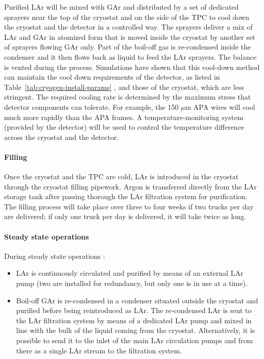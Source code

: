 Purified LAr will be mixed with GAr and distributed by a set of dedicated sprayers near the top of the cryostat and on the side of the TPC to cool down the cryostat and the detector in a controlled way. The sprayers deliver a mix of LAr and GAr in atomized form that is moved inside the cryostat by another set of sprayers flowing GAr only. Part of the boil-off gas is re-condensed inside the condenser and it then flows back as liquid to feed the LAr sprayers. The balance is vented during the process.
%
Simulations have shown that this cool-down method can maintain the cool down requirements of the detector, as listed in Table~\ref{tab:cryogen-install-params} , and those of the cryostat, which are less stringent. The required cooling rate is determined by the maximum stress that detector components can tolerate. For example, the 150 $\mu$m APA wires will cool much more rapidly than the APA frames. A temperature-monitoring system (provided by the detector) will be used to control the temperature difference across the cryostat and the detector.

\paragraph{Filling}

Once the cryostat and the TPC are cold, LAr is introduced in the cryostat through the cryostat filling pipework. Argon is transferred directly from the LAr storage tank after passing thorough the LAr filtration system for purification. The filling process will take place over three to four weeks if two trucks per day are delivered; if only one truck per day is delivered, it will take twice as long.

\paragraph{Steady state operations}

During steady state operations :
\begin{itemize}
\item LAr is continuously circulated and purified by means of an external LAr pump (two are installed for redundancy, but only one is in use at a time).
\item Boil-off GAr is re-condensed in a condenser situated outside the cryostat and purified before being reintroduced as LAr. The re-condensed LAr is sent to the LAr filtration system by means of a dedicated LAr pump and mixed in line with the bulk of the liquid coming from the cryostat. Alternatively, it is possible to send it to the inlet of the main LAr circulation pumps and from there as a single LAr stream to the filtration system.
\end{itemize}

